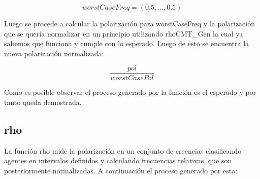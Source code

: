 \documentclass{article}
\begin{document}
    \[worstCaseFreq = (0.5, \ldots, 0.5)\]

    Luego se procede a calcular la polarización para worstCaseFreq y la polarización que se quería normalizar en un principio utilizando rhoCMT\_Gen la cual ya sabemos que funciona y cumple con lo esperado. Luego de esto se encuentra la nueva polarización normalizada:

    \[\frac{pol}{worstCasePol}\]

    Como es posible observar el proceso generado por la función es el esperado y por tanto queda demostrada.

    \subsection{rho}
    La función rho mide la polarización en un conjunto de creencias clasificando agentes en intervalos definidos y calculando frecuencias relativas, que son posteriormente normalizadas. A continuación el proceso generado por esta:
\end{document}
